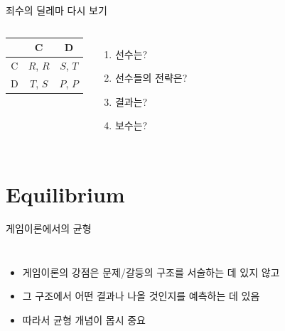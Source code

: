 \documentclass[final]{beamer}
\begin{document}
\begin{frame}[t]{죄수의 딜레마 다시 보기}
	\begin{columns}[c]
		\column{15em}
		\begin{center}
		\begin{table}
			\setlength{\tabcolsep}{1.2em}
			\begin{tabular}{|c|c|c|} \hline
				& {C} &  {D}\\ \hline
				{C} & {$R$}, {$R$} & {$S$}, {$T$} \\ \hline%
				{D} & {$T$}, {$S$}  & {$P$}, {$P$} \\ 
				\hline
			\end{tabular}
		\end{table}
		\end{center}
		\column{15em}
		\begin{enumerate}
			\item 선수는? 
			\item 선수들의 전략은? 
			\item 결과는? 
			\item 보수는?
		\end{enumerate}
	\end{columns}
\end{frame}

\section{Equilibrium} %
\label{sec:equilibrium}

\begin{frame}[t]{게임이론에서의 균형}
	\begin{columns}[c]
		\column{18em}
		\begin{itemize}
			\item 게임이론의 강점은 문제/갈등의 구조를 서술하는 데 있지 않고 
			\item 그 구조에서 어떤 결과나 나올 것인지를 예측하는 데 있음
			\item 따라서 균형 개념이 몹시 중요
		\end{itemize}
		\column{13em}
	\end{columns}
\end{frame}
\end{document}
